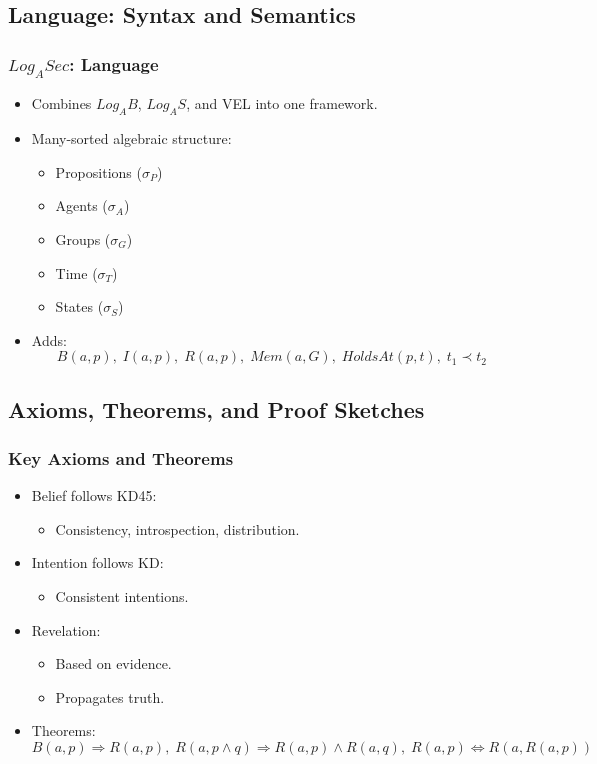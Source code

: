\documentclass[aspectratio=169]{beamer}
\begin{document}
\subsection{Language: Syntax and Semantics}
\begin{frame}
\frametitle{$Log_ASec$: Language}
\begin{itemize}
    \item Combines $Log_AB$, $Log_AS$, and VEL into one framework.
    \item Many-sorted algebraic structure:
    \begin{itemize}
        \item Propositions ($\sigma_P$)
        \item Agents ($\sigma_A$)
        \item Groups ($\sigma_G$)
        \item Time ($\sigma_T$)
        \item States ($\sigma_S$)
    \end{itemize}
    \item Adds:
    \[
    B(a, p), \; I(a, p), \; R(a, p), \;
    Mem(a, G), \; HoldsAt(p, t), \; t_1 \prec t_2
    \]
\end{itemize}
\end{frame}

\subsection{Axioms, Theorems, and Proof Sketches}
\begin{frame}
\frametitle{Key Axioms and Theorems}
\begin{itemize}
    \item Belief follows KD45:
    \begin{itemize}
        \item Consistency, introspection, distribution.
    \end{itemize}
    \item Intention follows KD:
    \begin{itemize}
        \item Consistent intentions.
    \end{itemize}
    \item Revelation:
    \begin{itemize}
        \item Based on evidence.
        \item Propagates truth.
    \end{itemize}
    \item Theorems:
    \[
    B(a, p) \Rightarrow R(a, p), \;
    R(a, p \wedge q) \Rightarrow R(a, p) \wedge R(a, q), \;
    R(a, p) \Leftrightarrow R(a, R(a, p))
    \]
\end{itemize}
\end{frame}
\end{document}
